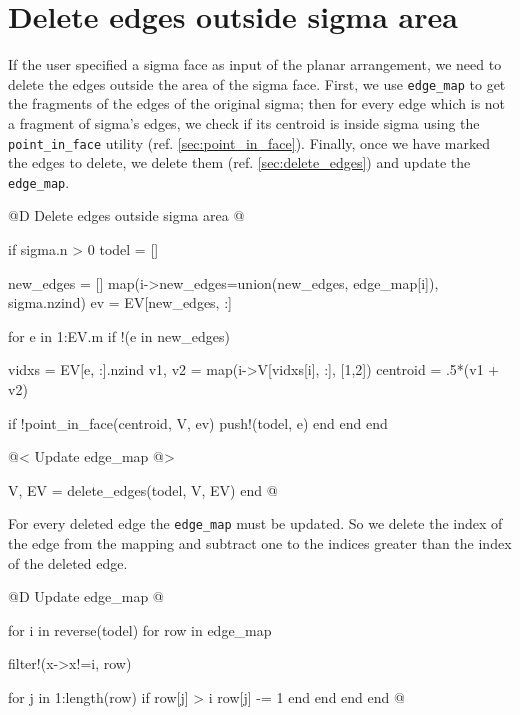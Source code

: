 \section{Delete edges outside sigma area}

If the user specified a sigma face as input of the planar arrangement,
we need to delete the edges outside the area of the sigma face. 
First, we use \texttt{edge\_map} to get the fragments of the edges of the original sigma;
then for every edge which is not a fragment of sigma's edges, we check if its centroid
is inside sigma using the \texttt{point\_in\_face} utility (ref. \ref{sec:point_in_face}).
Finally, once we have marked the edges to delete, we delete them (ref. \ref{sec:delete_edges}) and update the \texttt{edge\_map}.

@D Delete edges outside sigma area
@{if sigma.n > 0
    todel = []
    
    new_edges = []
    map(i->new_edges=union(new_edges, edge_map[i]), sigma.nzind)
    ev = EV[new_edges, :]

    for e in 1:EV.m
        if !(e in new_edges)

            vidxs = EV[e, :].nzind
            v1, v2 = map(i->V[vidxs[i], :], [1,2])
            centroid = .5*(v1 + v2)
            
            if !point_in_face(centroid, V, ev) 
                push!(todel, e)
            end
        end
    end

    @< Update edge\_map @>

    V, EV = delete_edges(todel, V, EV)
end
@}

\label{macro:update_edge_map}
For every deleted edge the \texttt{edge\_map} must be updated. 
So we delete the index of the edge from the mapping and subtract one 
to the indices greater than the index of the deleted edge.


@D Update edge\_map
@{for i in reverse(todel)
    for row in edge_map

        filter!(x->x!=i, row)

        for j in 1:length(row)
            if row[j] > i
                row[j] -= 1
            end
        end
    end
end
@}




